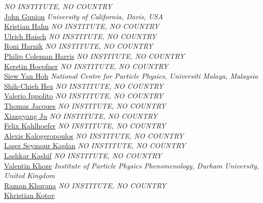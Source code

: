 \emph{NO INSTITUTE, NO COUNTRY}\\
\noindent\href{mailto:gunion@physics.ucdavis.edu}{John Gunion} 
\emph{University of California, Davis, USA}\\
\noindent\href{mailto:kristian.hahn@cern.ch}{Kristian Hahn} 
\emph{NO INSTITUTE, NO COUNTRY}\\
\noindent\href{mailto:ulrich.haisch@physics.ox.ac.uk}{Ulrich Haisch} 
\emph{NO INSTITUTE, NO COUNTRY}\\
\noindent\href{mailto:roni.harnik@gmail.com}{Roni Harnik} 
\emph{NO INSTITUTE, NO COUNTRY}\\
\noindent\href{mailto:philip.coleman.harris@cern.ch}{Philip Coleman Harris} 
\emph{NO INSTITUTE, NO COUNTRY}\\
\noindent\href{mailto:Kerstin.Hoepfner@cern.ch}{Kerstin Hoepfner} 
\emph{NO INSTITUTE, NO COUNTRY}\\
\noindent\href{mailto:siew.yan.hoh@cern.ch}{Siew Yan Hoh} 
\emph{National Centre for Particle Physics, Universiti Malaya, Malaysia}\\
\noindent\href{mailto:schsu@uw.edu}{Shih-Chieh Hsu} 
\emph{NO INSTITUTE, NO COUNTRY}\\
\noindent\href{mailto:valerio.ippolito@cern.ch}{Valerio Ippolito} 
\emph{NO INSTITUTE, NO COUNTRY}\\
\noindent\href{mailto:thomas.jacques@unige.ch}{Thomas Jacques} 
\emph{NO INSTITUTE, NO COUNTRY}\\
\noindent\href{mailto:Xiangyang.Ju@cern.ch}{Xiangyang Ju} 
\emph{NO INSTITUTE, NO COUNTRY}\\
\noindent\href{mailto:felix.kahlhoefer@desy.de}{Felix Kahlhoefer} 
\emph{NO INSTITUTE, NO COUNTRY}\\
\noindent\href{mailto:Alexis.Kalogeropoulos@cern.ch}{Alexis Kalogeropoulos} 
\emph{NO INSTITUTE, NO COUNTRY}\\
\noindent\href{mailto:laser.seymour.kaplan@cern.ch}{Laser Seymour Kaplan} 
\emph{NO INSTITUTE, NO COUNTRY}\\
\noindent\href{mailto:Lashkar.Kashif@cern.ch}{Lashkar Kashif} 
\emph{NO INSTITUTE, NO COUNTRY}\\
\noindent\href{mailto:valya.khoze@durham.ac.uk}{Valentin Khoze} 
\emph{Institute of Particle Physics Phenomenology, Durham University, United Kingdom}\\
\noindent\href{mailto:Raman.Khurana@cern.ch}{Raman Khurana} 
\emph{NO INSTITUTE, NO COUNTRY}\\
\noindent\href{mailto:khristian.kotov@cern.ch}{Khristian Kotov} 
